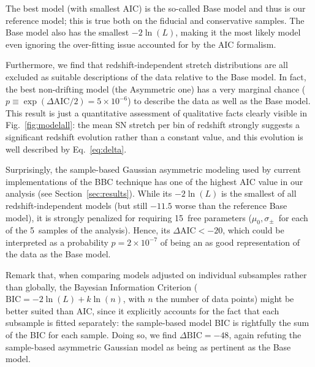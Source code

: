 \documentclass[]{aa}
\begin{document}
The best model (with smallest AIC) is the so-called Base model and thus is our
reference model; this is true both on the fiducial and conservative samples.
The Base model also has the smallest $-2\ln(L)$, making it the most likely
model even ignoring the over-fitting issue accounted for by the AIC formalism.

Furthermore, we find that redshift-independent stretch distributions are all
excluded as suitable descriptions of the data relative to the Base model. In
fact, the best non-drifting model (the Asymmetric one) has a very marginal
chance ($p \equiv \exp\left(\Delta\mathrm{AIC}/2\right) = 5\times10^{-6}$) to
describe the data as well as the Base model. This result is just a quantitative
assessment of qualitative facts clearly visible in Fig.~\ref{fig:modelall}: the
mean SN stretch per bin of redshift strongly suggests a significant redshift
evolution rather than a constant value, and this evolution is well described by
Eq.~\ref{eq:delta}.

Surprisingly, the sample-based Gaussian asymmetric modeling used by current
implementations of the BBC technique \citep{scolnic2016, kessler2017} has one of
the highest AIC value in our analysis (see Section~\ref{sec:results}). While its
$-2\ln(L)$ is the smallest of all redshift-independent models (but still $-11.5$
worse than the reference Base model), it is strongly penalized for requiring
15~free parameters ($\mu_0, \sigma_{\pm}$~for each of the 5~samples of the
analysis). Hence, its $\Delta\mathrm{AIC}<-20$, which could be interpreted as a
probability $p=2\times 10^{-7}$ of being an as good representation of the data
as the Base model.

Remark that, when comparing models adjusted on individual subsamples rather than
globally, the Bayesian Information Criterion ($\mathrm{BIC} = -2\ln(L) +
k\ln(n)$, with $n$ the number of data points) might be better suited than AIC,
since it explicitly accounts for the fact that each subsample is fitted
separately: the sample-based model BIC is rightfully the sum of the BIC for each
sample. Doing so, we find $\Delta\mathrm{BIC}=-48$, again refuting the
sample-based asymmetric Gaussian model as being as pertinent as the Base model.
\end{document}
